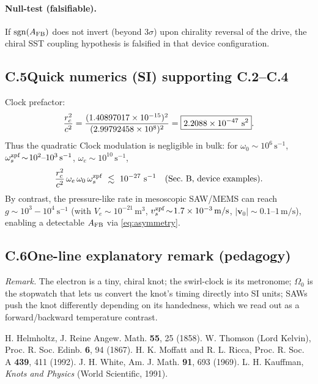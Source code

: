 \documentclass[aps,prb,preprint,amsmath,amssymb]{revtex4-2} %
\newcommand{\rcVal}{1.40897017\times10^{-15}} %
\newcommand{\rc}{r_c}
\begin{document}
    \paragraph*{Null-test (falsifiable).}
        If \(\mathrm{sgn}(A_{\rm FB})\) does not invert (beyond \(3\sigma\)) upon chirality reversal of the drive, the chiral SST coupling hypothesis is falsified in that device configuration.

    \subsection*{C.5\quad Quick numerics (SI) supporting C.2–C.4}
    \noindent Clock prefactor:
    \[
        \frac{\rc^{2}}{c^{2}}=\frac{(\rcVal)^2}{(\cVal)^2}=\boxed{2.2088\times 10^{-47}\ \mathrm{s^{2}}}.
    \]
    Thus the quadratic Clock modulation is negligible in bulk: for \(\omega_0\!\sim\!10^{6}\,\mathrm{s^{-1}}\), \(\omega_s^{\rm zpf}\!\sim\!10^{2}\text{–}10^{3}\,\mathrm{s^{-1}}\), \(\omega_e\!\sim\!10^{10}\,\mathrm{s^{-1}}\),
    \[
        \frac{\rc^2}{c^2}\,\omega_e\,\omega_0\,\omega_s^{\rm zpf}\ \lesssim\ 10^{-27}\ \mathrm{s^{-1}} \quad(\text{Sec.\ B, device examples}).
    \]
    By contrast, the pressure-like rate in mesoscopic SAW/MEMS can reach \(g\sim 10^{3}\!-\!10^{4}\ \mathrm{s^{-1}}\) (with \(V_e\!\sim\!10^{-21}\,\mathrm{m^{3}}\), \(v_s^{\rm zpf}\!\sim\!1.7\times10^{-3}\,\mathrm{m/s}\), \(|\mathbf v_0|\!\sim\!0.1\text{–}1\,\mathrm{m/s}\)), enabling a detectable \(A_{\rm FB}\) via \eqref{eq:asymmetry}.

    \subsection*{C.6\quad One-line explanatory remark (pedagogy)}
    \emph{Remark.} The electron is a tiny, chiral knot; the swirl-clock is its metronome; \(\Omega_{0}\) is the stopwatch that lets us convert the knot’s timing directly into SI units; SAWs push the knot differently depending on its handedness, which we read out as a forward/backward temperature contrast.

    \begin{thebibliography}{9}\setlength{\itemsep}{1pt}
     H. Helmholtz, %
    J. Reine Angew. Math. \textbf{55}, 25 (1858).
     W. Thomson (Lord Kelvin), %
    Proc. R. Soc. Edinb. \textbf{6}, 94 (1867).
     H. K. Moffatt and R. L. Ricca, %
    Proc. R. Soc. A \textbf{439}, 411 (1992).
     J. H. White, %
    Am. J. Math. \textbf{91}, 693 (1969).
     L. H. Kauffman, \textit{Knots and Physics} (World Scientific, 1991).
    \end{thebibliography}
\end{document}
